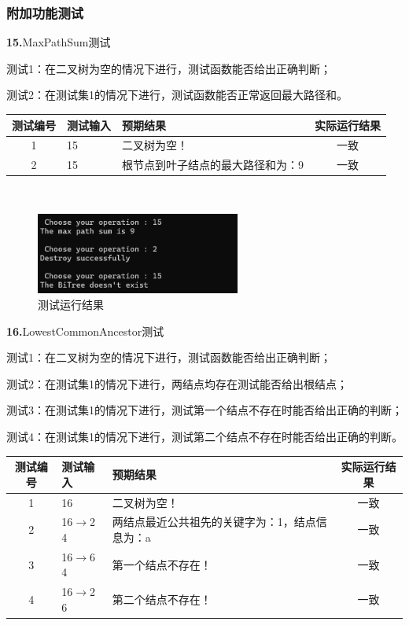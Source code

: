\documentclass[supercite]{Experimental_Report}
\theoremstyle{definition}
\begin{document}
\subsubsection{附加功能测试}

\noindent\textbf{15.}MaxPathSum测试
	
测试1：在二叉树为空的情况下进行，测试函数能否给出正确判断；

测试2：在测试集1的情况下进行，测试函数能否正常返回最大路径和。

\vspace{0.5em}

\begin{tabular}{|c|p{2.7cm}|p{6cm}|c|}
	\hline
	测试编号 & 测试输入 & 预期结果 & 实际运行结果 \\
	\hline
	1 & 15 & 二叉树为空！ & 一致 \\
	\hline
	2 & 15 & 根节点到叶子结点的最大路径和为：9 & 一致 \\
	\hline
\end{tabular}

~\

\begin{figure}[H]
 	\centering
 	\includegraphics[width=0.6\textwidth]{images/二叉树测试15.png}
 	\caption{测试运行结果}
 	\label{txlab}
 \end{figure}

\noindent\textbf{16.}LowestCommonAncestor测试
	
测试1：在二叉树为空的情况下进行，测试函数能否给出正确判断；

测试2：在测试集1的情况下进行，两结点均存在测试能否给出根结点；

测试3：在测试集1的情况下进行，测试第一个结点不存在时能否给出正确的判断；

测试4：在测试集1的情况下进行，测试第二个结点不存在时能否给出正确的判断。

\vspace{0.5em}

\begin{tabular}{|c|p{2.7cm}|p{6cm}|c|}
	\hline
	测试编号 & 测试输入 & 预期结果 & 实际运行结果 \\
	\hline
	1 & 16 & 二叉树为空！ & 一致 \\
	\hline
	2 & 16$\rightarrow$2 4 & 两结点最近公共祖先的关键字为：1，结点信息为：a & 一致 \\
	\hline
	3 & 16$\rightarrow$6 4 & 第一个结点不存在！& 一致 \\
	\hline
	4 & 16$\rightarrow$2 6 & 第二个结点不存在！ & 一致 \\
	\hline
\end{tabular}
\end{document}
